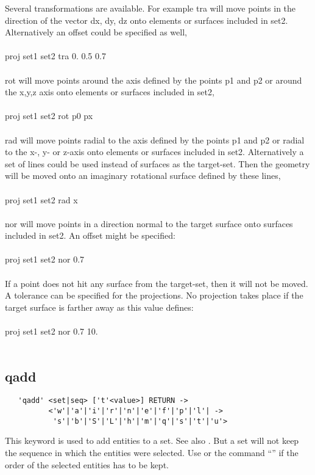 \documentclass{article}
\begin{document}
Several transformations are available. For example tra will move points in the direction of the vector dx, dy, dz onto elements or surfaces included in set2. Alternatively an offset could be specified as well,\\\\
proj set1 set2 tra 0. 0.5 0.7  \\\\
rot will move points around the axis defined by the points p1 and p2 or around the x,y,z axis onto elements or surfaces included in set2,\\\\
proj set1 set2 rot p0 px \\\\
rad will move points radial to the axis defined by the points p1 and p2 or radial to the x-, y- or z-axis onto elements or surfaces included in set2. Alternatively a set of lines could be used instead of surfaces as the target-set. Then the geometry will be moved onto an imaginary rotational surface defined by these lines,\\\\
proj set1 set2 rad x \\\\
nor will move points in a direction normal to the target surface onto surfaces included in set2. An offset might be specified:\\\\
proj set1 set2 nor 0.7 \\\\ 
If a point does not hit any surface from the target-set, then it will not be moved. A tolerance can be specified for the projections. No projection takes place if the target surface is farther away as this value defines:\\\\
proj set1 set2 nor 0.7 10. \\\\ 
 
\subsection{\label{qadd}qadd}
\begin{verbatim}
   'qadd' <set|seq> ['t'<value>] RETURN ->
          <'w'|'a'|'i'|'r'|'n'|'e'|'f'|'p'|'l'| ->
           's'|'b'|'S'|'L'|'h'|'m'|'q'|'s'|'t'|'u'> 
\end{verbatim}
This keyword is used to add entities to a set. See also . But a set will not keep the sequence in which the entities were selected. Use  or the command ``'' if the order of the selected entities has to be kept. 
\end{document}
